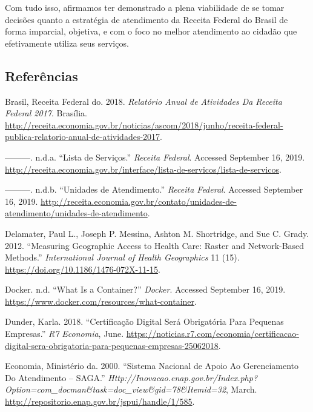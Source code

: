 \documentclass[]{article}
\begin{document}
Com tudo isso, afirmamos ter demonstrado a plena viabilidade de se tomar
decisões quanto a estratégia de atendimento da Receita Federal do Brasil
de forma imparcial, objetiva, e com o foco no melhor atendimento ao
cidadão que efetivamente utiliza seus serviços.

\hypertarget{referencias}{%
\subsection*{Referências}\label{referencias}}

\hypertarget{refs}{}
\leavevmode\hypertarget{ref-receita_federal_do_brasil_relatorio_2018}{}%
Brasil, Receita Federal do. 2018. \emph{Relatório Anual de Atividades Da
Receita Federal 2017}. Brasília.
\url{http://receita.economia.gov.br/noticias/ascom/2018/junho/receita-federal-publica-relatorio-anual-de-atividades-2017}.

\leavevmode\hypertarget{ref-receita_federal_do_brasil_lista_nodate}{}%
---------. n.d.a. ``Lista de Serviços.'' \emph{Receita Federal}.
Accessed September 16, 2019.
\url{http://receita.economia.gov.br/interface/lista-de-servicos/lista-de-servicos}.

\leavevmode\hypertarget{ref-receita_federal_do_brasil_unidades_nodate}{}%
---------. n.d.b. ``Unidades de Atendimento.'' \emph{Receita Federal}.
Accessed September 16, 2019.
\url{http://receita.economia.gov.br/contato/unidades-de-atendimento/unidades-de-atendimento}.

\leavevmode\hypertarget{ref-delamater_measuring_2012}{}%
Delamater, Paul L., Joseph P. Messina, Ashton M. Shortridge, and Sue C.
Grady. 2012. ``Measuring Geographic Access to Health Care: Raster and
Network-Based Methods.'' \emph{International Journal of Health
Geographics} 11 (15). \url{https://doi.org/10.1186/1476-072X-11-15}.

\leavevmode\hypertarget{ref-docker_what_nodate}{}%
Docker. n.d. ``What Is a Container?'' \emph{Docker}. Accessed September
16, 2019. \url{https://www.docker.com/resources/what-container}.

\leavevmode\hypertarget{ref-dunder_certificacao_2018}{}%
Dunder, Karla. 2018. ``Certificação Digital Será Obrigatória Para
Pequenas Empresas.'' \emph{R7 Economia}, June.
\url{https://noticias.r7.com/economia/certificacao-digital-sera-obrigatoria-para-pequenas-empresas-25062018}.

\leavevmode\hypertarget{ref-ministerio_da_economia_sistema_2000}{}%
Economia, Ministério da. 2000. ``Sistema Nacional de Apoio Ao
Gerenciamento Do Atendimento -- SAGA.''
\emph{Http://Inovacao.enap.gov.br/Index.php?Option=com\_docman\&task=doc\_view\&gid=78\&Itemid=32},
March. \url{http://repositorio.enap.gov.br/jspui/handle/1/585}.
\end{document}
